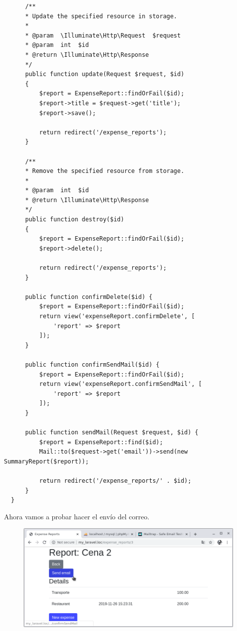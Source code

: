 \documentclass{article}
\begin{document}
\begin{verbatim}
      /**
      * Update the specified resource in storage.
      *
      * @param  \Illuminate\Http\Request  $request
      * @param  int  $id
      * @return \Illuminate\Http\Response
      */
      public function update(Request $request, $id)
      {
          $report = ExpenseReport::findOrFail($id);
          $report->title = $request->get('title');
          $report->save();

          return redirect('/expense_reports');
      }

      /**
      * Remove the specified resource from storage.
      *
      * @param  int  $id
      * @return \Illuminate\Http\Response
      */
      public function destroy($id)
      {
          $report = ExpenseReport::findOrFail($id);
          $report->delete();

          return redirect('/expense_reports');
      }

      public function confirmDelete($id) {
          $report = ExpenseReport::findOrFail($id);
          return view('expenseReport.confirmDelete', [
              'report' => $report
          ]);
      }

      public function confirmSendMail($id) {
          $report = ExpenseReport::findOrFail($id);
          return view('expenseReport.confirmSendMail', [
              'report' => $report
          ]);
      }

      public function sendMail(Request $request, $id) {
          $report = ExpenseReport::find($id);
          Mail::to($request->get('email'))->send(new SummaryReport($report));

          return redirect('/expense_reports/' . $id);
      }
  }
\end{verbatim}

Ahora vamos a probar hacer el envío del correo.

\begin{figure}[h!]
  \centering
  \includegraphics[scale=0.5]{./Pictures/130_send_mail.png}
\end{figure}
\end{document}
